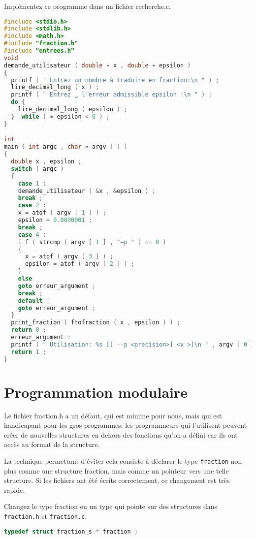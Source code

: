 Implémentez ce programme dans un fichier recherche.c.
\begin{solutioncachee}
  \begin{lstlisting}[language=C]
#include <stdio.h>
#include <stdlib.h>
#include <math.h>
#include "fraction.h"
#include "entrees.h"
void
demande_utilisateur ( double ∗ x , double ∗ epsilon )
{
  printf ( " Entrez un nombre à traduire en fraction:\n " ) ;
  lire_decimal_long ( x ) ;
  printf ( " Entrez ␣ l'erreur admissible epsilon :\n " ) ;
  do {
    lire_decimal_long ( epsilon ) ;
  }  while ( ∗ epsilon < 0 ) ;
}

int
main ( int argc , char ∗ argv [ ] )
{
  double x , epsilon ;
  switch ( argc )
  {
    case 1 :
    demande_utilisateur ( &x , &epsilon ) ;
    break ;
    case 2 :
    x = atof ( argv [ 1 ] ) ;
    epsilon = 0.0000001 ;
    break ;
    case 4 :
    i f ( strcmp ( argv [ 1 ] , "−p " ) == 0 )
    {
      x = atof ( argv [ 3 ] ) ;
      epsilon = atof ( argv [ 2 ] ) ;
    }
    else
    goto erreur_argument ;
    break ;
    default :
    goto erreur_argument ;
  }
  print_fraction ( ftofraction ( x , epsilon ) ) ;
  return 0 ;
  erreur_argument :
  printf ( " Utilisation: %s [[ --p <precision>] <x >]\n " , argv [ 0 ] ) ;
  return 1 ;
}

\end{lstlisting}
\end{solutioncachee}

\section{Programmation modulaire}

Le fichier fraction.h a un défaut, qui est minime pour nous, mais qui
est handicapant pour les gros programmes: les programmeurs qui
l’utilisent peuvent créer de nouvelles structures en dehors des
fonctions qu’on a défini car ils ont accès au format de la structure.

La technique permettant d’éviter cela consiste à déclarer le type
\texttt{fraction} non plus comme une structure fraction, mais comme un pointeur
vers une telle structure. Si les fichiers ont été écrits correctement,
ce changement est très rapide.


\question Changez le type fraction en un type qui pointe sur des structures dans \texttt{fraction.h}
et \texttt{fraction.c}.

\begin{solutioncachee}
  \begin{lstlisting}[language=C]
typedef struct fraction_s * fraction ;
  \end{lstlisting}
\end{solutioncachee}

